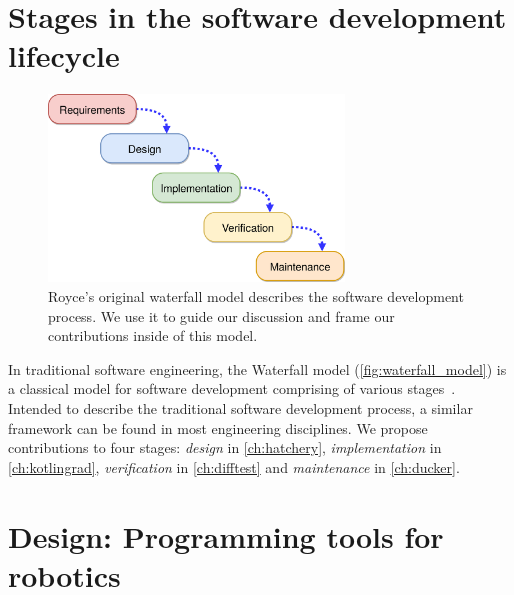 \documentclass[12pt,initial,twoside,maitrise]{dms}
\numberwithin{equation}{section}
\numberwithin{table}{chapter}
\numberwithin{figure}{chapter}
\begin{document}

\section{Stages in the software development lifecycle}\label{sec:sldc-stages}

\begin{figure}
    \centering
    \includegraphics[width=0.70\textwidth]{../figures/waterfall_diagram.png}
    \caption{Royce's original waterfall model describes the software development process. We use it to guide our discussion and frame our contributions inside of this model.\vspace{-10pt}}
    \label{fig:waterfall_model}
\end{figure}

In traditional software engineering, the Waterfall model (\autoref{fig:waterfall_model}) is a classical model for software development comprising of various stages~\citep{royce1987managing}. Intended to describe the traditional software development process, a similar framework can be found in most engineering disciplines. We propose contributions to four stages: \textit{design} in \autoref{ch:hatchery}, \textit{implementation} in \autoref{ch:kotlingrad}, \textit{verification} in \autoref{ch:difftest} and \textit{maintenance} in \autoref{ch:ducker}.

\section{Design: Programming tools for robotics}
\end{document}
